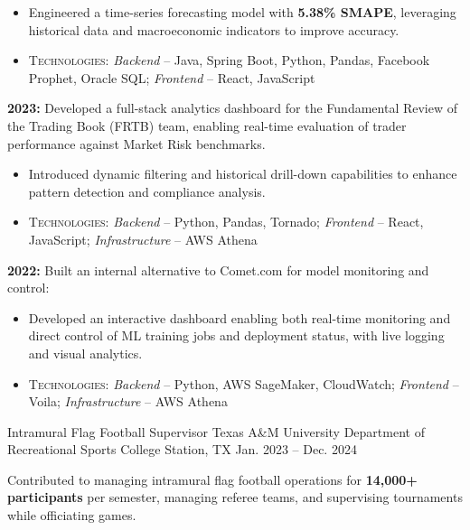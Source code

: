 \begin{cventries}
{\begin{cvitems}
{\begin{itemize}
            \item Engineered a time-series forecasting model with \textbf{5.38\% SMAPE}, leveraging historical data and macroeconomic indicators to improve accuracy.
            \item \textsc{Technologies}: \textit{Backend} – Java, Spring Boot, Python, Pandas, Facebook Prophet, Oracle SQL; \textit{Frontend} – React, JavaScript
          \end{itemize}
            }
            \item { \textbf{2023:} Developed a full-stack analytics dashboard for the Fundamental Review of the Trading Book (FRTB) team, enabling real-time evaluation of trader performance against Market Risk benchmarks.
            \begin{itemize}
            \item Introduced dynamic filtering and historical drill-down capabilities to enhance pattern detection and compliance analysis.            
            \item \textsc{Technologies}: \textit{Backend} – Python, Pandas, Tornado; \textit{Frontend} – React, JavaScript; \textit{Infrastructure} – AWS Athena
            \end{itemize}
            }
            \item{ \textbf{2022:} Built an internal alternative to Comet.com for model monitoring and control:
            \begin{itemize}
                \item Developed an interactive dashboard enabling both real-time monitoring and direct control of ML training jobs and deployment status, with live logging and visual analytics.
                \item \textsc{Technologies}: \textit{Backend} – Python, AWS SageMaker, CloudWatch; \textit{Frontend} – Voila; \textit{Infrastructure} – AWS Athena
            \end{itemize}
            } 
          \end{cvitems}
        }
\cventry
  {Intramural Flag Football Supervisor} %
  {Texas A\&M University Department of Recreational Sports} %
  {College Station, TX} %
  {Jan. 2023 -- Dec. 2024} %
  {
    \begin{cvitems}
      \item{Contributed to managing intramural flag football operations for \textbf{14,000+ participants} per semester, managing referee teams, and supervising tournaments while officiating games.
}
\end{cvitems}}
\end{cventries}

